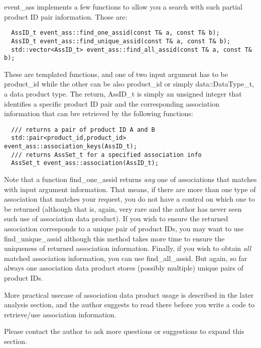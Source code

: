 {\ttfamily event\_ass} implements a few functions to allow you a search with such partial product ID pair information.
Those are:
\begin{lstlisting}
  AssID_t event_ass::find_one_assid(const T& a, const T& b);
  AssID_t event_ass::find_unique_assid(const T& a, const T& b);
  std::vector<AssID_t> event_ass::find_all_assid(const T& a, const T& b);
\end{lstlisting}
These are templated functions, and one of two input argument has to be {\ttfamily product\_id} while the other
can be also {\ttfamily product\_id} or simply {\ttfamily data::DataType\_t}, a data product type.
The return, {\ttfamily AssID\_t} is simply an unsigned integer that identifies a specific product ID pair and the corresponding
association information that can bre retrieved by the following functions:
\begin{lstlisting}
  /// returns a pair of product ID A and B
  std::pair<product_id,product_id> event_ass::association_keys(AssID_t);
  /// returns AssSet_t for a specified association info
  AssSet_t event_ass::association(AssID_t); 
\end{lstlisting}

Note that a function {\ttfamily find\_one\_assid} returns {\it any} one of associations that matches with input argument information.
That means, if there are more than one type of association that matches your request, you do not have a control on which one to be
returned (although that is, again, very rare and the author has never seen such use of association data product). If you wish to
ensure the returned association corresponds to a unique pair of product IDs, you may want to use {\ttfamily find\_unique\_assid}
although this method takes more time to ensure the uniqueness of returned association information. Finally, if you wish to obtain
{\it all} matched association information, you can use {\ttfamily find\_all\_assid}. But again, so far always one association
data product stores (possibly multiple) unique pairs of product IDs.

More practical usecase of association data product usage is described in the later analysis section, and the author suggests to
read there before you write a code to retrieve/use association information.

Please contact the author to ask more questions or suggestions to expand this section.
